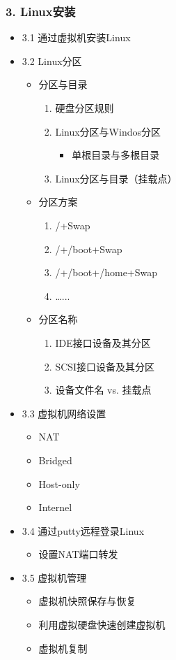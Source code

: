 \documentclass[bigger]{beamer}
\begin{document}
\begin{frame}
\frametitle{3. Linux安装}
\label{sec-1-3}
\begin{itemize}

\item 3.1 通过虚拟机安装Linux
\label{sec-1-3-1}%

\item 3.2 Linux分区
\label{sec-1-3-2}%
\begin{itemize}
\item 分区与目录
\begin{enumerate}
\item 硬盘分区规则
\item Linux分区与Windos分区
\begin{itemize}
\item 单根目录与多根目录
\end{itemize}
\item Linux分区与目录（挂载点）
\end{enumerate}
\item 分区方案
\begin{enumerate}
\item /+Swap
\item /+/boot+Swap
\item /+/boot+/home+Swap
\item \ldots{}...
\end{enumerate}
\item 分区名称
\begin{enumerate}
\item IDE接口设备及其分区
\item SCSI接口设备及其分区
\item 设备文件名 vs. 挂载点
\end{enumerate}
\end{itemize}

\item 3.3 虚拟机网络设置
\label{sec-1-3-3}%
\begin{itemize}
\item NAT
\item Bridged
\item Host-only
\item Internel
\end{itemize}

\item 3.4 通过putty远程登录Linux
\label{sec-1-3-4}%
\begin{itemize}
\item 设置NAT端口转发
\end{itemize}

\item 3.5 虚拟机管理
\label{sec-1-3-5}%
\begin{itemize}
\item 虚拟机快照保存与恢复
\item 利用虚拟硬盘快速创建虚拟机
\item 虚拟机复制
\end{itemize}
\end{itemize} %
\end{frame}
\end{document}
